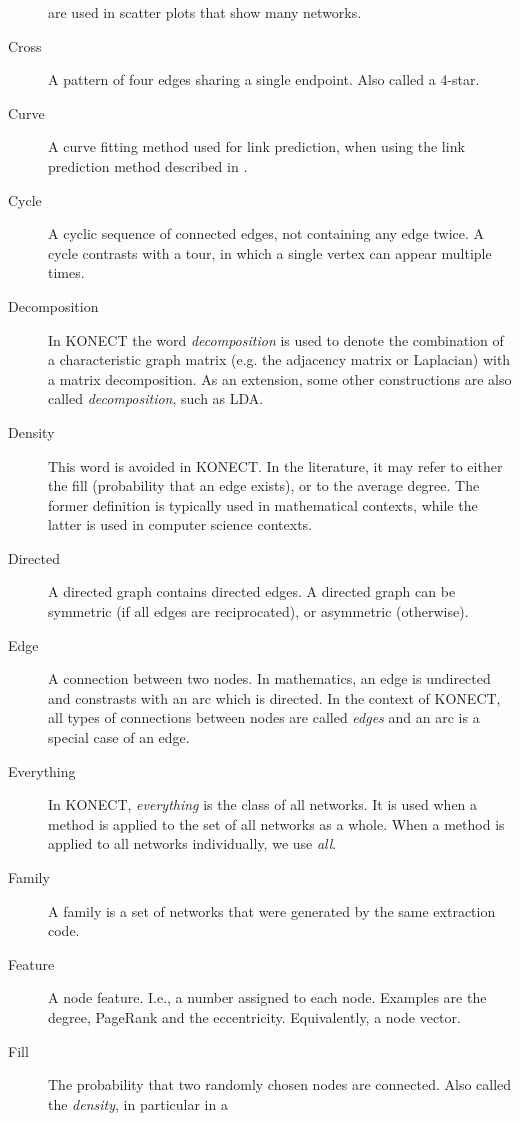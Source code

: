 \documentclass{article}
\begin{document}
\begin{description}
    are used in scatter plots that show many networks.  
  \item[Cross]
    A pattern of four edges sharing a single endpoint.  Also called a
    4-star.  
  \item[Curve]
    A curve fitting method used for link prediction, when using the link
    prediction method described
    in \citep{kunegis:spectral-transformation}.
  \item[Cycle] 
    A cyclic sequence of connected edges, not containing any edge twice.
    A cycle contrasts with a tour, in which a single vertex can appear
    multiple times.  
  \item[Decomposition] In KONECT the word \emph{decomposition} is used
    to denote the combination of a characteristic graph matrix (e.g. the
    adjacency matrix or Laplacian) with a matrix decomposition.  As an
    extension, some other constructions are also called
    \emph{decomposition}, such as LDA.
  \item[Density] This word is avoided in KONECT.  In the literature, it
    may refer to either the fill (probability that an edge exists), or to
    the average degree.  The former definition is typically used in mathematical
    contexts, while the latter is used in computer science contexts.
  \item[Directed] A directed graph contains directed edges.  A directed
    graph can be symmetric (if all edges are reciprocated), or
    asymmetric (otherwise). 
  \item[Edge] A connection between two nodes.  In mathematics, an edge
    is undirected and constrasts with an arc which is directed.  In the
    context of KONECT, all types of connections between nodes are called
    \emph{edges} and an arc is a special case of an edge. 
  \item[Everything] In KONECT, \emph{everything} is the class of all
    networks.  It is used when a method is applied to the set of all
    networks as a whole.  When a method is applied to all networks
    individually, we use \emph{all}. 
  \item[Family] A family is a set of networks that were generated by the
    same extraction code.  
  \item[Feature] A node feature. I.e., a number assigned to each node.
    Examples are the degree, PageRank and the eccentricity. 
    Equivalently, a node vector.
  \item[Fill] The probability that two randomly chosen nodes are
    connected.  Also called the \emph{density}, in particular in a

\end{description}
\end{document}

